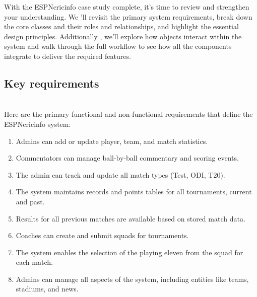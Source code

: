 

With the ESPNcricinfo case study complete, it's time to review and strengthen your understanding. We 'll revisit the primary system requirements, break down the core classes and their roles and relationships, and highlight the essential design principles. Additionally
, we'll explore how objects interact within the system and walk through the full workflow to see how all the components integrate to deliver the required features.

\subsection{Key requirements}\label{T87OGNc-JtSrZ38QZbTtP}
\\
Here are the primary functional and non-functional requirements that define the ESPNcricinfo system:

\begin{enumerate}
\item
\protect{}\label{hVPG88qD-l6vO7GEl-VBU}
Admins can add or update player, team, and match statistics.
\item
\protect{}\label{bcrYer2MpomAGNHYbxnAt}
Commentators can manage ball-by-ball commentary and scoring events.
\item
\protect{}\label{gR1dOfPSi0_C1VCsW2fTI}
The admin can track and update all match types (Test, ODI, T20).
\item
\protect{}\label{5WIl8W-BgHFr4mKNDUuY0}
The system maintains records and points tables for all tournaments, current and past.
\item
\protect{}\label{cwgdluYrT_DZ8avRH-8lF}
Results for all previous matches are available based on stored match data.
\item
\protect{}\label{DWSEEC_MGO8G5hrhxtClq}
Coaches can create and submit squads for tournaments.
\item
\protect{}\label{iE-XlwMk-_bOKizc2ni6s}
The system enables the selection of the playing eleven from the squad for each match.
\item
\protect{}\label{TZbhRWqYRv19Z96YJ2CX5}
Admins can manage all aspects of the system, including entities like teams, stadiums, and news.
\end{enumerate}

